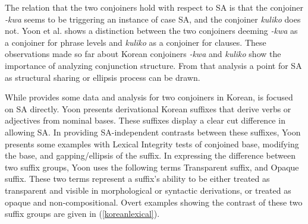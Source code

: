 The relation that the two conjoiners hold with respect to SA is that the conjoiner \textit{-kwa} seems to be triggering an instance of case SA, and the conjoiner \textit{kuliko} does not. Yoon et al. shows a distinction between the two conjoiners deeming \textit{-kwa} as a conjoiner for phrase levels and \textit{kuliko} as a conjoiner for clauses. These observations made so far about Korean conjoiners \textit{-kwa} and \textit{kuliko} show the importance of analyzing conjunction structure. From that analysis a point for SA as structural sharing or ellipsis process can be drawn. 

While \cite{yoon2005conjunction} provides some data and analysis for two conjoiners in Korean, \cite{yoon2017lexical} is focused on SA directly. Yoon presents derivational Korean suffixes that derive verbs or adjectives from nominal bases. These suffixes display a clear cut difference in allowing SA. In providing SA-independent contrasts between these suffixes, Yoon presents some examples with Lexical Integrity tests of conjoined base, modifying the base, and gapping/ellipsis of the suffix. In expressing the difference between two suffix groups, Yoon uses the following terms Transparent suffix, and Opaque suffix. These two terms represent a suffix's ability to be either treated as transparent and visible in morphological or syntactic derivations, or treated as opaque and non-compositional. Overt examples showing the contrast of these two suffix groups are given in (\ref{koreanlexical}).


